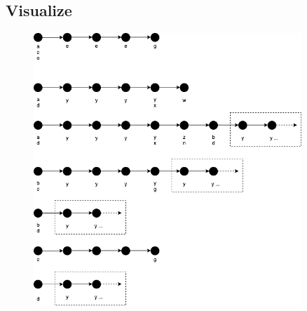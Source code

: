 
\subsection{Visualize}


\begin{figure}[h!]
	\centering \includegraphics[width=0.9\textwidth]{images/Q1-1.png}
\end{figure}